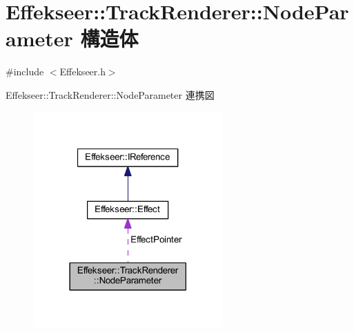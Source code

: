 \hypertarget{struct_effekseer_1_1_track_renderer_1_1_node_parameter}{}\section{Effekseer\+:\+:Track\+Renderer\+:\+:Node\+Parameter 構造体}
\label{struct_effekseer_1_1_track_renderer_1_1_node_parameter}


{\ttfamily \#include $<$Effekseer.\+h$>$}



Effekseer\+:\+:Track\+Renderer\+:\+:Node\+Parameter 連携図\nopagebreak
\begin{figure}[H]
\begin{center}
\leavevmode
\includegraphics[width=206pt]{struct_effekseer_1_1_track_renderer_1_1_node_parameter__coll__graph}
\end{center}
\end{figure}
